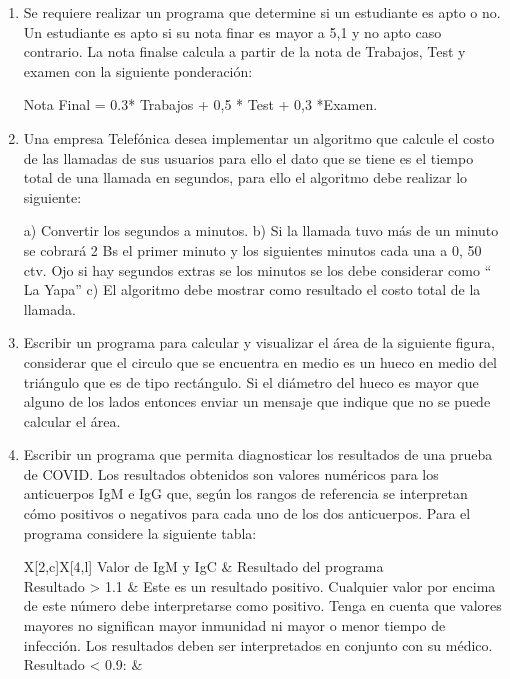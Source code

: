 \documentclass{scrartcl}
\begin{document}
\begin{enumerate}
		\item Se requiere realizar un programa que determine si un estudiante es apto o no. Un estudiante es apto si su nota finar es mayor a 5,1 y no apto caso contrario. La nota finalse calcula a partir de la nota de Trabajos, Test y examen con la siguiente ponderación:
		
		Nota Final = 0.3* Trabajos + 0,5 * Test + 0,3 *Examen.
		
		\item Una empresa Telefónica desea implementar un algoritmo que calcule el costo de las llamadas de sus usuarios para ello el dato que se tiene es el tiempo total de una llamada en segundos, para ello el algoritmo debe realizar lo siguiente:
		
		a) Convertir los segundos a minutos.
		b) Si la llamada tuvo más de un minuto se cobrará 2 Bs el primer minuto y los
		siguientes minutos cada una a 0, 50 ctv. Ojo si hay segundos extras se los
		minutos se los debe considerar como “ La Yapa”
		c) El algoritmo debe mostrar como resultado el costo total de la llamada.
		
		\item Escribir un programa para calcular y visualizar el área de la siguiente figura, considerar que el circulo que se encuentra en medio es un hueco en medio del triángulo que es de tipo rectángulo. Si el diámetro del hueco es mayor que alguno de los lados entonces enviar un mensaje que indique que no se puede calcular el área.
		
		\item Escribir un programa que permita diagnosticar los resultados de una prueba de COVID. Los resultados obtenidos son valores numéricos para los anticuerpos IgM e IgG que, según los rangos de referencia se interpretan cómo positivos o negativos para cada uno de los dos anticuerpos. Para el programa considere la siguiente tabla:
		
		\begin{table}[ht]
			\centering
			\begin{tblr}{X[2,c]X[4,l]}
					\hline
					Valor de IgM y IgC & Resultado del programa \\
					Resultado > 1.1  &  
					\hline
					Este es un resultado positivo. Cualquier valor por encima de este número debe interpretarse como positivo. Tenga en cuenta que valores mayores no significan mayor inmunidad ni mayor o menor tiempo de infección. Los resultados deben ser interpretados en conjunto con su médico. \\
					\hline
					Resultado < 0.9:  &
				

\end{tblr}
\end{table}
\end{enumerate}
\end{document}
